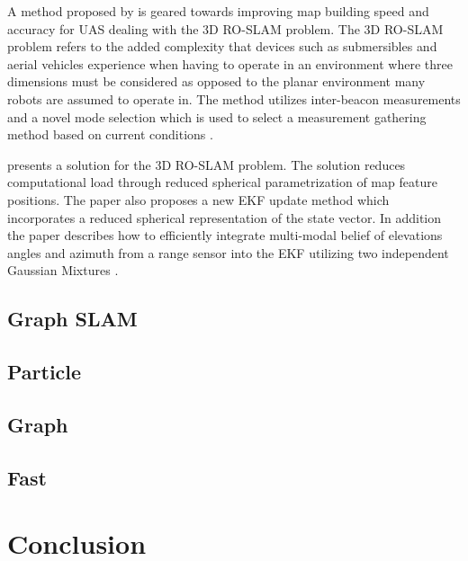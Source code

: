 \documentclass[conference]{IEEEtran}
\begin{document}
A method proposed by \cite{Dios2015} is geared towards improving map building speed and accuracy for UAS dealing with the 3D RO-SLAM problem. The 3D RO-SLAM problem refers to the added complexity that devices such as submersibles \cite{Newman} and aerial vehicles experience when having to operate in an environment where three dimensions must be considered as opposed to the planar environment many robots are assumed to operate in. The method utilizes inter-beacon measurements and a novel mode selection which is used to select a measurement gathering method based on current conditions \cite{Dios2015}.

\cite{Fabresse2013} presents a solution for the 3D RO-SLAM problem. The solution reduces computational load through reduced spherical parametrization of map feature positions. The paper also proposes a new EKF update method which incorporates a reduced spherical representation of the state vector. In addition the paper describes how to efficiently integrate multi-modal belief of elevations angles and azimuth from a range sensor into the EKF utilizing two independent Gaussian Mixtures \cite{Fabresse}.






\subsection{Graph SLAM}
\subsection{Particle}
\subsection{Graph}
\subsection{Fast}

\section{Conclusion}


	
	
	
\end{document}
